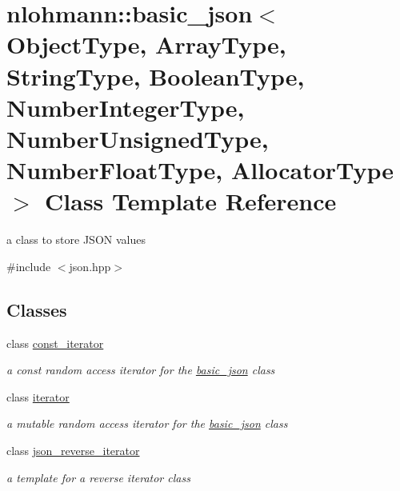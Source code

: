\hypertarget{a00025}{}\section{nlohmann\+:\+:basic\+\_\+json$<$ Object\+Type, Array\+Type, String\+Type, Boolean\+Type, Number\+Integer\+Type, Number\+Unsigned\+Type, Number\+Float\+Type, Allocator\+Type $>$ Class Template Reference}
\label{a00025}


a class to store J\+S\+ON values  




{\ttfamily \#include $<$json.\+hpp$>$}

\subsection*{Classes}
\begin{DoxyCompactItemize}
\item 
class \hyperlink{a00038}{const\+\_\+iterator}
\begin{DoxyCompactList}\small\item\em a const random access iterator for the \hyperlink{a00025}{basic\+\_\+json} class \end{DoxyCompactList}\item 
class \hyperlink{a00079}{iterator}
\begin{DoxyCompactList}\small\item\em a mutable random access iterator for the \hyperlink{a00025}{basic\+\_\+json} class \end{DoxyCompactList}\item 
class \hyperlink{a00080}{json\+\_\+reverse\+\_\+iterator}
\begin{DoxyCompactList}\small\item\em a template for a reverse iterator class \end{DoxyCompactList}\end{DoxyCompactItemize}
